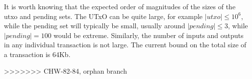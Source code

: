 \documentclass{article}
\theoremstyle{definition}{
  \newtheorem{lemma}{Lemma}[section] %
  \newtheorem{definition}[lemma]{Definition}
}
\theoremstyle{theorem}{
  \newtheorem{invariant}[lemma]{Invariant}
  \newtheorem{proofobligation}[lemma]{Proof Obligation}
}
\numberwithin{equation}{lemma}
\begin{document}
It is worth knowing that the expected
order of magnitudes of the sizes of the utxo and pending sets. The UTxO can be
quite large, for example $|utxo| \leq 10^6$, while the pending set will
typically be small, usually around $|pending| \leq 3$, while $|pending| = 100$
would be extreme. Similarly, the number of inputs and outputs in any individual
transaction is not large. The current bound on the total size of a transaction
is 64Kb.


%
>>>>>>> CHW-82-84, orphan branch
%
\end{document}
